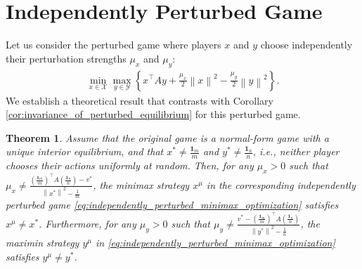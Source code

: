 \documentclass{article}
\newcommand{\X}{\mathcal{X}}
\newcommand{\Y}{\mathcal{Y}}
\newcommand{\bone}{\mathbf{1}}
\theoremstyle{plain}
\newtheorem{theorem}{Theorem}[section]
\begin{document}
\section{Independently Perturbed Game}
\label{sec:appx_independently_perturbed_game}
Let us consider the perturbed game where players $x$ and $y$ choose independently their perturbation strengths $\mu_x$ and $\mu_y$:
\begin{align}
    \min_{x\in \X}\max_{y\in \Y} \left\{x^{\top}Ay + \frac{\mu_x}{2}\left\|x\right\|^2 - \frac{\mu_y}{2}\left\|y\right\|^2\right\}.
    \label{eq:independently_perturbed_minimax_optimization}
\end{align}
We establish a theoretical result that contrasts with Corollary \ref{cor:invariance_of_perturbed_equilibrium} for this perturbed game.
\begin{theorem}
    Assume that the original game is a normal-form game with a unique interior equilibrium, and that $x^{\ast} \neq \frac{\bone_m}{m}$ and $y^{\ast} \neq \frac{\bone_n}{n}$, i.e., neither player chooses their actions uniformly at random.
    Then, for any $\mu_x > 0$ such that $\mu_x \neq \frac{\left(\frac{\bone_m}{m}\right)^{\top}A\left(\frac{\bone_n}{n}\right) - v^{\ast}}{\left\|x^{\ast}\right\|^2 - \frac{1}{m}}$, the minimax strategy $x^{\mu}$ in the corresponding independently perturbed game \eqref{eq:independently_perturbed_minimax_optimization} satisfies $x^{\mu} \neq x^{\ast}$.
    Furthermore, for any $\mu_y > 0$ such that $\mu_y \neq \frac{v^{\ast} - \left(\frac{\bone_m}{m}\right)^{\top}A\left(\frac{\bone_n}{n}\right)}{\left\|y^{\ast}\right\|^2 - \frac{1}{n}}$, the maximin strategy $y^{\mu}$ in \eqref{eq:independently_perturbed_minimax_optimization} satisfies $y^{\mu} \neq y^{\ast}$.
    \label{thm:independently_perturbed_game}
\end{theorem}
\end{document}
